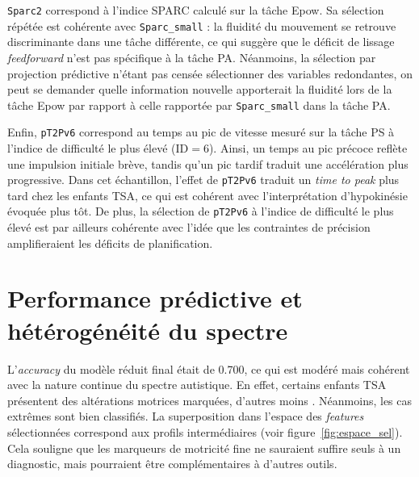 \medskip 

\texttt{Sparc2} correspond à l'indice SPARC calculé sur la tâche Epow. Sa sélection répétée est cohérente avec \texttt{Sparc\_small} : la fluidité du mouvement se retrouve discriminante dans une tâche différente, ce qui suggère que le déficit de lissage \textit{feedforward} n'est pas spécifique à la tâche PA. Néanmoins, la sélection par projection prédictive n'étant pas censée sélectionner des variables redondantes, on peut se demander quelle information nouvelle apporterait la fluidité lors de la tâche Epow par rapport à celle rapportée par \texttt{Sparc\_small} dans la tâche PA.

\medskip 

Enfin, \texttt{pT2Pv6} correspond au temps au pic de vitesse mesuré sur la tâche PS à l'indice de difficulté le plus élevé ($\text{ID} = 6$). Ainsi, un temps au pic précoce reflète une impulsion initiale brève, tandis qu'un pic tardif traduit une accélération plus progressive. Dans cet échantillon, l'effet de \texttt{pT2Pv6} traduit un \textit{time to peak} plus tard chez les enfants TSA, ce qui est cohérent avec l'interprétation d'hypokinésie évoquée plus tôt. De plus, la sélection de \texttt{pT2Pv6} à l'indice de difficulté le plus élevé est par ailleurs cohérente avec l'idée que les contraintes de précision amplifieraient les déficits de planification.
%

\section{Performance prédictive et hétérogénéité du spectre}

L'\textit{accuracy} du modèle réduit final était de 0.700, ce qui est modéré mais cohérent avec la nature continue du spectre autistique. En effet, certains enfants TSA présentent des altérations motrices marquées, d'autres moins \parencite{hocking_what_2017}. Néanmoins, les cas extrêmes sont bien classifiés. La superposition dans l'espace des \textit{features} sélectionnées correspond aux profils intermédiaires (voir figure~\ref{fig:espace_sel}). Cela souligne que les marqueurs de motricité fine ne sauraient suffire seuls à un diagnostic, mais pourraient être complémentaires à d'autres outils.


